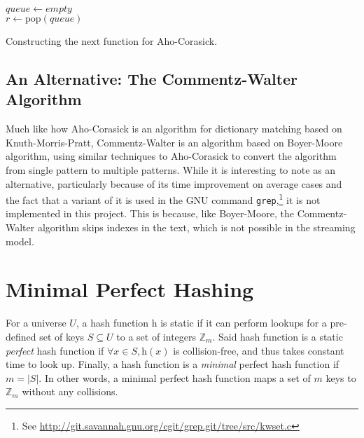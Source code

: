 \documentclass[ %
                    author={Dominic Joseph Moylett},
                supervisor={Dr. Raphael Clifford and Dr. Benjamin Sach},
                    degree={MEng},
                     title={Dictionary Matching with Fingerprints},
                  subtitle={An Empirical Analysis},
                      type={Research},
                      year={2014} ]{dissertation}
\begin{document}
\begin{algorithm}[t]
$queue \gets empty$\\
 {
  $r \gets \text{pop}(queue)$\\
}
\caption{Constructing the $\text{next}$ function for Aho-Corasick.}
\label{alg:ac-next}
\end{algorithm}

\subsection{An Alternative: The Commentz-Walter Algorithm}

Much like how Aho-Corasick is an algorithm for dictionary matching based on Knuth-Morris-Pratt, Commentz-Walter\cite{commentz-walter:algo} is an algorithm based on Boyer-Moore algorithm, using similar techniques to Aho-Corasick to convert the algorithm from single pattern to multiple patterns. While it is interesting to note as an alternative, particularly because of its time improvement on average cases and the fact that a variant of it is used in the GNU command \texttt{grep},\footnote{See \url{http://git.savannah.gnu.org/cgit/grep.git/tree/src/kwset.c}} it is not implemented in this project. This is because, like Boyer-Moore, the Commentz-Walter algorithm skips indexes in the text, which is not possible in the streaming model.

\section{Minimal Perfect Hashing}
\label{min-perf-hash}

\noindent
For a universe $U$, a hash function $\text{h}$ is static if it can perform lookups for a pre-defined set of keys $S \subseteq U$ to a set of integers $\mathbb{Z}_m$. Said hash function is a static \textit{perfect} hash function if $\forall x \in S, \text{h}(x)$ is collision-free, and thus takes constant time to look up. Finally, a hash function is a \textit{minimal} perfect hash function if $m = |S|$. In other words, a minimal perfect hash function maps a set of $m$ keys to $\mathbb{Z}_m$ without any collisions.
\end{document}
